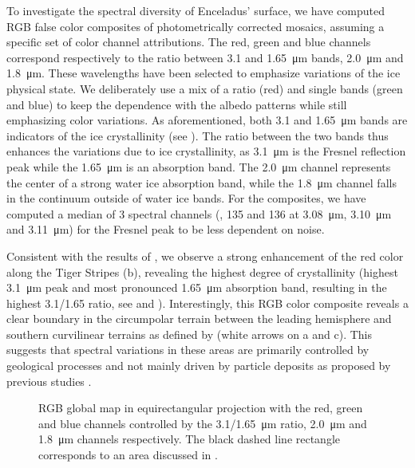 \documentclass{arxiv-icarus}
\begin{document}
To investigate the spectral diversity of Enceladus' surface, we have computed RGB false color composites of photometrically corrected mosaics, assuming a specific set of color channel attributions. The red, green and blue channels correspond respectively to the ratio between 3.1 and \SI{1.65}{\um} bands, \SI{2.0}{\um} and \SI{1.8}{\um}. These wavelengths have been selected to emphasize variations of the ice physical state. We deliberately use a mix of a ratio (red) and single bands (green and blue) to keep the dependence with the albedo patterns while still emphasizing color variations. As aforementioned, both \num{3.1} and \SI{1.65}{\um} bands are indicators of the ice crystallinity (see ). The ratio between the two bands thus enhances the variations due to ice crystallinity, as \SI{3.1}{\um} is the Fresnel reflection peak while the \SI{1.65}{\um} is an absorption band. The \SI{2.0}{\um} channel represents the center of a strong water ice absorption band, while the \SI{1.8}{\um} channel falls in the continuum outside of water ice bands. For the composites, we have computed a median of 3 spectral channels (, 135 and 136 at \SI{3.08}{\um}, \SI{3.10}{\um} and \SI{3.11}{\um}) for the Fresnel peak to be less dependent on noise.

Consistent with the results of \cite{Brown2006}, we observe a strong enhancement of the red color along the Tiger Stripes (b), revealing the highest degree of crystallinity (highest \SI{3.1}{\um} peak and most pronounced \SI{1.65}{\um} absorption band, resulting in the highest \num{3.1/1.65} ratio, see  and ). Interestingly, this RGB color composite reveals a clear boundary in the circumpolar terrain between the leading hemisphere and southern curvilinear terrains as defined by \cite{Crow-Willard2015} (white arrows on a and c). This suggests that spectral variations in these areas are primarily controlled by geological processes and not mainly driven by particle deposits as proposed by previous studies \citep{Schenk2011, Scipioni2017}.

\begin{figure}[!ht]
    \caption{RGB global map in equirectangular projection with the red, green and blue channels controlled by the \SI{3.1/1.65}{\um} ratio, \SI{2.0}{\um} and \SI{1.8}{\um} channels respectively. The black dashed line rectangle corresponds to an area discussed in .}
    \label{fig:fig_10}
\end{figure}
\end{document}
